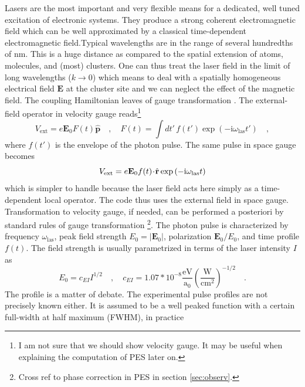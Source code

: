 \documentclass[final,1p]{elsarticle}
\newcommand{\PGRfoot}[1]{{\color{blue}\footnote{\color{blue} #1}}}
\begin{document}
Lasers are the most important and very flexible means for a dedicated,
well tuned excitation of electronic systems.  They produce a strong
coherent electromagnetic field which can be well approximated by a
classical time-dependent electromagnetic field.Typical wavelengths are
in the range of several hundredths of nm. This is a huge distance as
compared to the spatial extension of atoms, molecules, and (most)
clusters.  One can thus treat the laser field in the limit of long
wavelengths ($k \rightarrow 0$) which means to deal with a spatially
homogeneous electrical field $\mathbf{E}$ at the cluster site and we
can neglect the effect of the magnetic field.  The coupling
Hamiltonian leaves of gauge transformation \cite{Jac62}.
The external-field operator in velocity gauge reads\PGRfoot{I am not
  sure that we should show velocity gauge. It may be useful when
  explaining the computation of PES later on.}
\begin{equation}
  V_\mathrm{ext}
  =
  e\mathcal{\mathbf{E}}_0F(t)\hat{\mathbf{p}}
  \quad,\quad
  F(t)
  =
  \int dt'\,f(t')\exp{(-\mathrm{i}\omega_\mathrm{las}t')}
  \quad,
\label{eq:laserp}
\end{equation}
where $f(t')$ is the envelope of the photon pulse.
The same pulse in space gauge becomes
\begin{equation}
  V_\mathrm{ext}
  =
  e{\cal\bf E}_0f(t)\!\cdot\!\hat{\mathbf{r}}
  \exp{(-\mathrm{i}\omega_\mathrm{las}t)}
\label{eq:laserr}
\end{equation}
which is simpler to handle because the laser field acts here simply as
a time-dependent local operator. The code thus uses the external field
in space gauge. Transformation to velocity gauge, if needed, can
be performed a posteriori by standard rules of gauge transformation
\cite{Mes95aB}\PGRfoot{Cross ref to phase correction in PES in section
\ref{sec:observ}.}.
%
The photon pulse is characterized by frequency
$\omega_\mathrm{las}$, peak field strength $E_0=|\mathbf{E}_0|$,
polarization $\mathbf{E}_0/E_0$, and time profile $f(t)$. The
field strength is usually parametrized in terms of the laser intensity
$I$ as
\begin{equation}
  E_0
  =
  c_{EI}
  I^{1/2}
  \quad,\quad
  c_{EI}
  =
  1.07*10^{-8}
  \frac{\mathrm{eV}}{\mathrm{a}_0}
  \left(\frac{\mathrm{W}}{\mathrm{cm}^2}\right)^{-1/2}
  \quad.
\end{equation}
The profile is a matter of debate.  The experimental pulse profiles
are not precisely known either.  It is assumed to be a well peaked
function with a certain full-width at half maximum (FWHM), in practice
\end{document}
